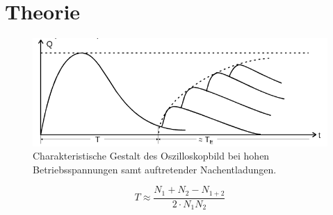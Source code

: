 \section{Theorie}
\label{sec:Theorie}
\begin{figure}
  \centering
  \includegraphics[width=\textwidth]{Bilder/erholzeit.png}
  \caption{Charakteristische Gestalt des Oszilloskopbild bei hohen Betriebsspannungen samt auftretender Nachentladungen. \cite{Anleitung}}
  \label{fig:nachladen}
\end{figure}


\begin{equation}
  \label{eqn:totzeit}
  T \approx \frac{N_1+N_2-N_{1+2}}{2\cdot N_1N_2}
\end{equation}
